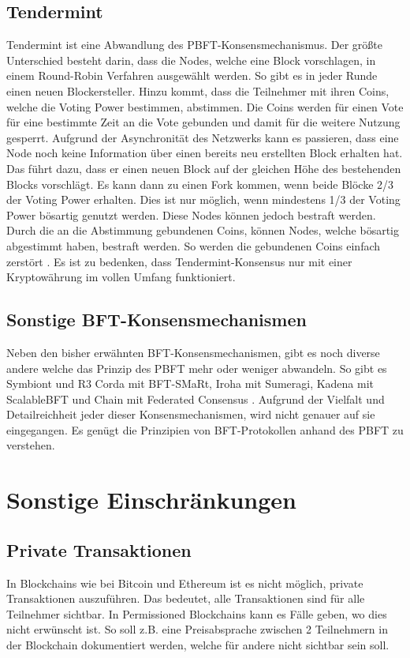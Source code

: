 \subsection{Tendermint}
Tendermint ist eine Abwandlung des PBFT-Konsensmechanismus. Der größte Unterschied besteht darin, dass die Nodes, welche eine Block vorschlagen, in einem Round-Robin Verfahren ausgewählt werden. So gibt es in jeder Runde einen neuen Blockersteller. Hinzu kommt, dass die Teilnehmer mit ihren Coins, welche die Voting Power bestimmen, abstimmen. Die Coins werden für einen Vote für eine bestimmte Zeit an die Vote gebunden und damit für die weitere Nutzung gesperrt. Aufgrund der Asynchronität des Netzwerks kann es passieren, dass eine Node noch keine Information über einen bereits neu erstellten Block erhalten hat. Das führt dazu, dass er einen neuen Block auf der gleichen Höhe des bestehenden Blocks vorschlägt. Es kann dann zu einen Fork kommen, wenn beide Blöcke 2/3 der Voting Power erhalten. Dies ist nur möglich, wenn mindestens 1/3 der Voting Power bösartig genutzt werden. Diese Nodes können jedoch bestraft werden. Durch die an die Abstimmung gebundenen Coins, können Nodes, welche bösartig abgestimmt haben, bestraft werden. So werden die gebundenen Coins einfach zerstört \cite{KwonTendermintConsensusmining2014}\cite{BuchmanTendermintByzantineFault2016}. Es ist zu bedenken, dass Tendermint-Konsensus nur mit einer Kryptowährung im vollen Umfang funktioniert.

\subsection{Sonstige BFT-Konsensmechanismen}
Neben den bisher erwähnten BFT-Konsensmechanismen, gibt es noch diverse andere welche das Prinzip des PBFT mehr oder weniger abwandeln. So gibt es Symbiont und R3 Corda mit BFT-SMaRt, Iroha mit Sumeragi, Kadena mit ScalableBFT und Chain mit Federated Consensus \cite{CachinBlockchainConsensusProtocols2017}. Aufgrund der Vielfalt und Detailreichheit jeder dieser Konsensmechanismen, wird nicht genauer auf sie eingegangen. Es genügt die Prinzipien von BFT-Protokollen anhand des PBFT zu verstehen.

\section{Sonstige Einschränkungen}

\subsection{Private Transaktionen}
In Blockchains wie bei Bitcoin und Ethereum ist es nicht möglich, private Transaktionen auszuführen. Das bedeutet, alle Transaktionen sind für alle Teilnehmer sichtbar. In Permissioned Blockchains kann es Fälle geben, wo dies nicht erwünscht ist. So soll z.B. eine Preisabsprache zwischen 2 Teilnehmern in der Blockchain dokumentiert werden, welche für andere nicht sichtbar sein soll.


